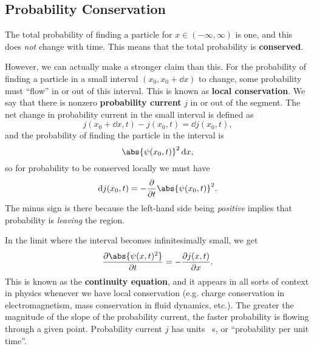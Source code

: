 \documentclass[../quantum_mechanics.tex]{subfiles}
\begin{document}
        \subsection{Probability Conservation}\label{subsec:probability-conservation}
            The total probability of finding a particle for $x\in(-\infty,\infty)$ is one, and this does \textit{not} change with time.
            This means that the total probability is \textbf{conserved}.

            However, we can actually make a stronger claim than this.
            For the probability of finding a particle in a small interval $(x_0,x_0+\dd{x})$ to change, some probability must ``flow'' in or out of this interval.
            This is known as \textbf{local conservation}.
            We say that there is nonzero \textbf{probability current} $j$ in or out of the segment.
            The net change in probability current in the small interval is defined as
            \begin{equation}
                j(x_0+\dd{x},t)-j(x_0,t)=\dd{j}(x_0,t),
            \end{equation}
            and the probability of finding the particle in the interval is
            \begin{equation}
                \abs{\psi(x_0,t)}^2\dd{x},
            \end{equation}
            so for probability to be conserved locally we must have
            \begin{equation}
                \dd{j}(x_0,t)=-\pdv{}{t}\abs{\psi(x_0,t)}^2.
            \end{equation}
            The minus sign is there because the left-hand side being \textit{positive} implies that probability is \textit{leaving} the region.

            In the limit where the interval becomes infinitesimally small, we get
            \begin{equation}\label{eq:probability-continuity-equation}
                \pdv{\abs{\psi(x,t)^2}}{t}=-\pdv{j(x,t)}{x}.
            \end{equation}
            This is known as the \textbf{continuity equation}, and it appears in all sorts of context in physics whenever we have local conservation (e.g. charge conservation in electromagnetism, mass conservation in fluid dynamics, etc.).
            The greater the magnitude of the slope of the probability current, the faster probability is flowing through a given point.
            Probability current $j$ has units \unit{\per\second}, or ``probability per unit time''.
\end{document}
